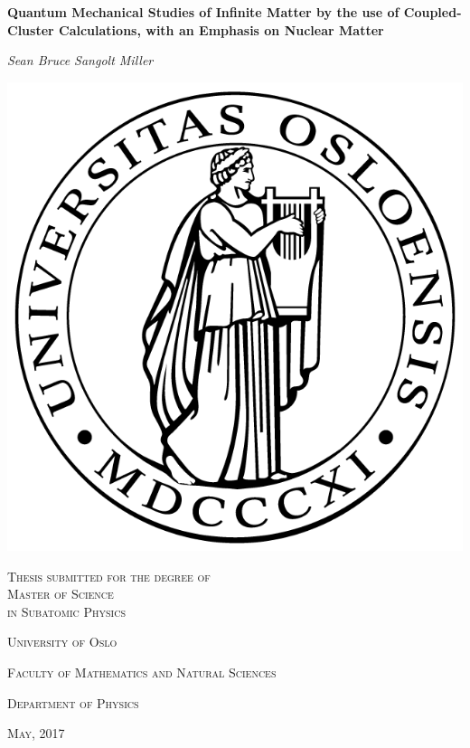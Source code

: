 \documentclass[10pt,twoside]{report}
\begin{document}
	
	
	\begin{titlepage}
		\centering
		\vspace{3cm}
		\vspace{1.5cm}
		{\huge\bfseries Quantum Mechanical Studies of Infinite Matter by the use of Coupled-Cluster Calculations, with an Emphasis on Nuclear Matter\par}
		\vspace{2cm}
		{\Large\itshape Sean Bruce Sangolt Miller\par}
		\vfill
		\includegraphics*[scale=0.2]{posliten.png}
		\vfill
		{\scshape\large Thesis submitted for the degree of \\ 
			 Master of Science \\ in Subatomic Physics \par}
		\vfill
		{\scshape\LARGE University of Oslo \par}
		{\scshape\large Faculty of Mathematics and Natural Sciences \par}
		{\scshape\large Department of Physics \par}
		
		\vspace{0.5cm}
		
		{\large \scshape May, 2017 \par}
	\end{titlepage}
	
\end{document}
